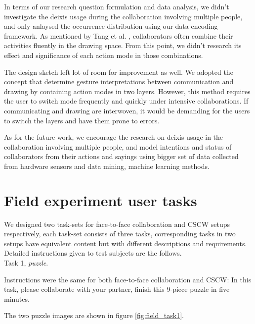 \documentclass[12pt,twoside]{article}
\begin{document}
In terms of our research question formulation and data analysis, we didn't investigate the deixis usage during the collaboration involving multiple people, and only anlaysed the occurrence distribution using our data encoding framework. As mentioned by Tang et al. \cite{tang1991findings}, collaborators often combine their activities fluently in the drawing space. From this point, we didn't research its effect and significance of each action mode in those combinations.

The design sketch left lot of room for improvement as well. We adopted the concept that determine gesture interpretations between communication and drawing by containing action modes in two layers. However, this method requires the user to switch mode frequently and quickly under intensive collaborations. If communicating and drawing are interwoven, it would be demanding for the users to switch the layers and have them prone to errors. 

As for the future work, we encourage the research on deixis usage in the collaboration involving multiple people, and model intentions and status of collaborators from their actions and sayings using bigger set of data collected from hardware sensors and data mining, machine learning methods.



\appendix
\section{Field experiment user tasks}
\label{appdx:user tasks}

We designed two task-sets for face-to-face collaboration and CSCW setups respectively, each task-set consists of three tasks, corresponding tasks in two setups have equivalent content but with different descriptions and requirements. Detailed instructions given to test subjects are the follows.\\

Task 1, \textit{puzzle}.

Instructions were the same for both face-to-face collaboration and CSCW: In this task, please collaborate with your partner, finish this 9-piece puzzle in five minutes. 

The two puzzle images are shown in figure \ref{fig:field_task1}. \\
\end{document}
